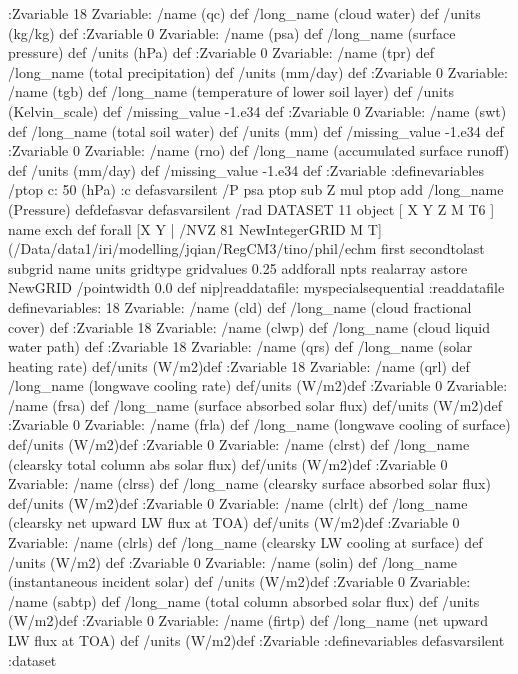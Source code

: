 \begin{ingrid}
{:Zvariable
18 Zvariable: /name (qc) def /long_name (cloud water) def /units (kg/kg) def
:Zvariable
0 Zvariable: /name (psa) def /long_name (surface pressure)  def /units (hPa) def
:Zvariable
0 Zvariable: /name (tpr) def /long_name (total precipitation)  def /units (mm/day) def
:Zvariable
0 Zvariable: /name (tgb) def /long_name (temperature of lower soil layer) def /units (Kelvin_scale) def
/missing_value -1.e34 def
:Zvariable
0 Zvariable: /name (swt) def /long_name (total soil water)  def /units (mm) def
/missing_value -1.e34 def
:Zvariable
0 Zvariable: /name (rno) def /long_name (accumulated surface runoff)  def /units (mm/day) def
/missing_value -1.e34 def
:Zvariable
:definevariables
/ptop c:
    50 (hPa) :c
    defasvarsilent
  /P {psa ptop sub Z mul ptop add /long_name (Pressure) def}defasvar
} defasvarsilent
/rad {
DATASET 11 object
[ X Y Z M T6 ] {  name exch def } forall
[X
    Y | 
/NVZ 81 NewIntegerGRID
    M T] (/Data/data1/iri/modelling/jqian/RegCM3/tino/phil/echm%
        first secondtolast subgrid
        name units gridtype gridvalues
            {0.25 add}forall npts realarray astore
            NewGRID
         /pointwidth 0.0 def
         nip]readdatafile: 
myspecialsequential
:readdatafile
definevariables:
18 Zvariable: /name (cld) def /long_name (cloud fractional cover) def :Zvariable
18 Zvariable: /name (clwp) def /long_name (cloud liquid water path) def :Zvariable
18 Zvariable: /name (qrs) def /long_name (solar heating rate) def/units (W/m2)def  :Zvariable
18 Zvariable: /name (qrl) def /long_name (longwave cooling rate) def/units (W/m2)def  :Zvariable
0 Zvariable: /name (frsa) def /long_name (surface absorbed solar flux) def/units (W/m2)def  :Zvariable
0 Zvariable: /name (frla) def /long_name (longwave cooling of surface) def/units (W/m2)def  :Zvariable
0 Zvariable: /name (clrst) def /long_name (clearsky total column abs solar flux) def/units (W/m2)def  :Zvariable
0 Zvariable: /name (clrss) def /long_name (clearsky surface absorbed solar flux) def/units (W/m2)def  :Zvariable
0 Zvariable: /name (clrlt) def /long_name (clearsky net upward LW flux at TOA) def/units (W/m2)def  :Zvariable
0 Zvariable: /name (clrls) def /long_name (clearsky LW cooling at surface) def /units (W/m2) def :Zvariable
0 Zvariable: /name (solin) def /long_name (instantaneous incident solar) def /units (W/m2)def :Zvariable
0 Zvariable: /name (sabtp) def /long_name (total column absorbed solar flux) def /units (W/m2)def :Zvariable
0 Zvariable: /name (firtp) def /long_name (net upward LW flux at TOA) def /units (W/m2)def :Zvariable
:definevariables
} defasvarsilent
:dataset
\end{ingrid}
